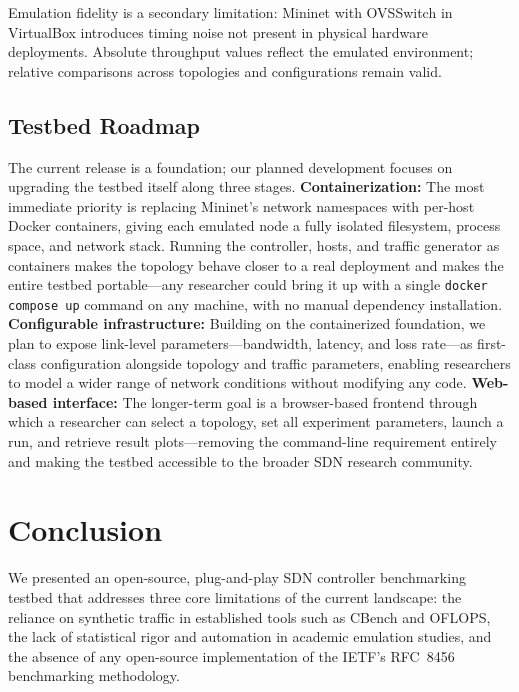 \documentclass[conference]{IEEEtran}
\begin{document}
Emulation fidelity is a secondary limitation: Mininet
with OVSSwitch in VirtualBox introduces timing noise not
present in physical hardware deployments. Absolute
throughput values reflect the emulated environment;
relative comparisons across topologies and configurations
remain valid.

\subsection{Testbed Roadmap}

The current release is a foundation; our planned development
focuses on upgrading the testbed itself along three stages.
\textbf{Containerization:} The most immediate priority is
replacing Mininet's network namespaces with per-host Docker
containers, giving each emulated node a fully isolated
filesystem, process space, and network stack. Running the
controller, hosts, and traffic generator as containers
makes the topology behave closer to a real deployment and
makes the entire testbed portable---any researcher could
bring it up with a single \texttt{docker compose up} command
on any machine, with no manual dependency installation.
\textbf{Configurable infrastructure:} Building on the
containerized foundation, we plan to expose link-level
parameters---bandwidth, latency, and loss rate---as
first-class configuration alongside topology and traffic
parameters, enabling researchers to model a wider range
of network conditions without modifying any code.
\textbf{Web-based interface:} The longer-term goal is a
browser-based frontend through which a researcher can
select a topology, set all experiment parameters, launch
a run, and retrieve result plots---removing the command-line
requirement entirely and making the testbed accessible to
the broader SDN research community.

\section{Conclusion}
\label{sec:conclusion}

We presented an open-source, plug-and-play SDN controller
benchmarking testbed that addresses three core limitations
of the current landscape: the reliance on synthetic traffic
in established tools such as CBench and OFLOPS, the
lack of statistical rigor and automation in academic
emulation studies, and the absence of any open-source
implementation of the IETF's RFC~8456 benchmarking
methodology.
\end{document}
